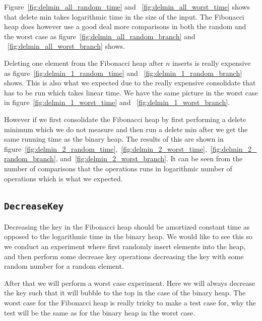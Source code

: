 \documentclass[a4paper,oneside,article,11pt]{memoir}
\begin{document}
Figure~\ref{fig:delmin_all_random_time} and ~\ref{fig:delmin_all_worst_time} shows that delete min takes logarithmic time in the size of the  input. The Fibonacci heap does however use a good deal more comparisons in both the random and the worst case as figure~\ref{fig:delmin_all_random_branch} and ~\ref{fig:delmin_all_worst_branch} shows.

Deleting one element from the Fibonacci heap after $n$ inserts is really expensive as figure~\ref{fig:delmin_1_random_time} and ~\ref{fig:delmin_1_random_branch} shows. This is also what we expected due to the really expensive consolidate that has to be run which takes linear time. We have the same picture in the worst case in figure~\ref{fig:delmin_1_worst_time} and ~\ref{fig:delmin_1_worst_branch}.

However if we first consolidate the Fibonacci heap by first performing a delete minimum which we do not measure and then run a delete min after we get the same running time as the binary heap. The results of this are shown in figure~\ref{fig:delmin_2_random_time},~\ref{fig:delmin_2_worst_time},~\ref{fig:delmin_2_random_branch}, and~\ref{fig:delmin_2_worst_branch}. It can be seen from the number of comparisons that the operations runs in logarithmic number of operations which is what we expected.

\subsection{\texttt{DecreaseKey}}
Decreasing the key in the Fibonacci heap should be amortized constant time as opposed to the logarithmic time in the binary heap. We would like to see this so we conduct an experiment where first randomly insert elements into the heap, and then perform some decrease key operations decreasing the key with some random number for a random element.

After that we will perform a worst case experiment. Here we will always decrease the key such that it will bubble to the top in the case of the binary heap. The worst case for the Fibonacci heap is really tricky to make a test case for, why the test will be the same as for the binary heap in the worst case.
\end{document}
